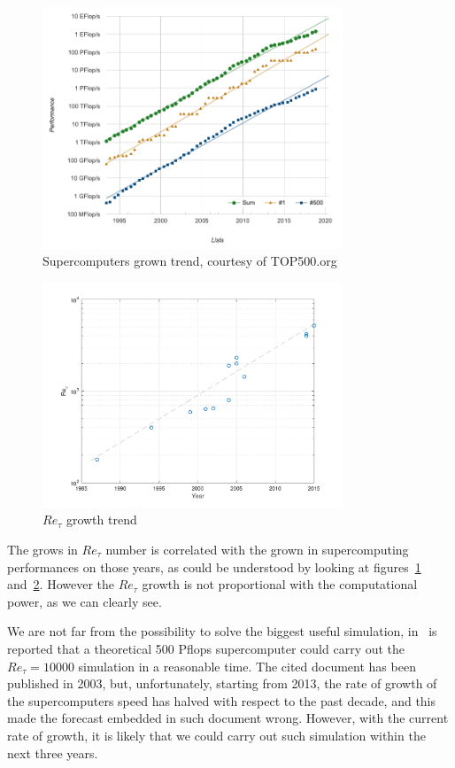 \begin{figure}
\begin{center}
\includegraphics[width=0.8\textwidth]{grafici/top500hist}
\caption{Supercomputers grown trend, courtesy of TOP500.org}
\label{top500}
\end{center}
\end{figure}
\begin{figure}
\begin{center}
\includegraphics[width=0.8\textwidth]{grafici/dns_trend}
\caption{$Re_{\tau}$ growth trend}
\label{dns:trend}
\end{center}
\end{figure}

The grows in $Re_{\tau}$ number is correlated with the grown in supercomputing performances on those years, as could be understood by looking at figures~\ref{top500} and~\ref{dns:trend}. However the $Re_{\tau}$ growth is not proportional with the computational power, as we can clearly see. \par
We are not far from the possibility to solve the biggest useful simulation, in~\cite{Jimenez2003} is reported that a theoretical 500 Pflops supercomputer could carry out the $Re_{\tau}=10000$ simulation in a reasonable time. The cited document has been published in 2003, but, unfortunately, starting from 2013, the rate of growth of the supercomputers speed has halved with respect to the past decade, and this made the forecast embedded in such document wrong. However, with the current rate of growth, it is likely that we could carry out such simulation within the next three years. \\~\par

